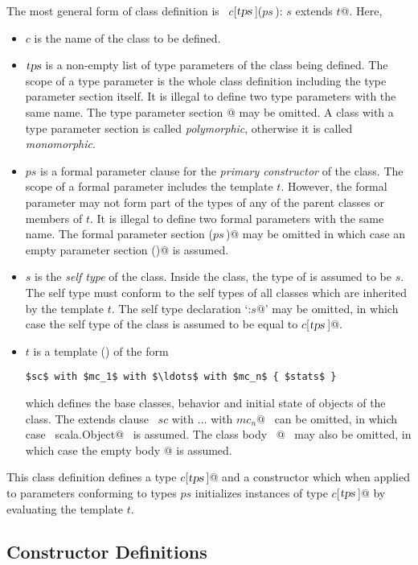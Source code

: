 \documentclass[a4paper,12pt,twoside,titlepage]{book}
\newcommand{\tps}{\mbox{\sl tps}}
\begin{document}
The most general form of class definition is 
~\lstinline@class $c$[$\tps\,$]($ps\,$): $s$ extends $t$@.
Here,
\begin{itemize}
\item[]
$c$ is the name of the class to be defined.
\item[] $\tps$ is a non-empty list of type parameters of the class
being defined.  The scope of a type parameter is the whole class
definition including the type parameter section itself.  It is
illegal to define two type parameters with the same name.  The type
parameter section \lstinline@[$\tps\,$]@ may be omitted. A class with a type
parameter section is called {\em polymorphic}, otherwise it is called
{\em monomorphic}.
\item[] 
$ps$ is a formal parameter clause for the {\em primary
constructor} of the class. The scope of a formal parameter includes
the template $t$. However, the formal parameter may not form 
part of the types of any of the parent classes or members of $t$.
It is illegal to define two formal parameters with the same name.
The formal parameter section \lstinline@($ps\,$)@ may be omitted in which case
an empty parameter section \lstinline@()@ is assumed.
\item[] 
$s$ is the {\em self type} of the class. Inside the
class, the type of  is assumed to be $s$.  The self
type must conform to the self types of all classes which are inherited
by the template $t$. The self type declaration `\lstinline@:$s$@' may be
omitted, in which case the self type of the class is assumed to be
equal to \lstinline@$c$[$\tps\,$]@.
\item[] 
$t$ is a
template () of the form
\begin{lstlisting}
$sc$ with $mc_1$ with $\ldots$ with $mc_n$ { $stats$ }
\end{lstlisting}
which defines the base classes, behavior and initial state of objects of
the class. The extends clause ~\lstinline@extends $sc$ with $\ldots$ with $mc_n$@~ 
can be omitted, in which case
~\lstinline@extends scala.Object@~ is assumed.  The class body
~@~ may also be omitted, in which case the empty body
\lstinline@{}@ is assumed.
\end{itemize}
This class definition defines a type \lstinline@$c$[$\tps\,$]@ and a constructor
which when applied to parameters conforming to types $ps$
initializes instances of type \lstinline@$c$[$\tps\,$]@ by evaluating the template
$t$.

\subsection{Constructor Definitions}
\end{document}
